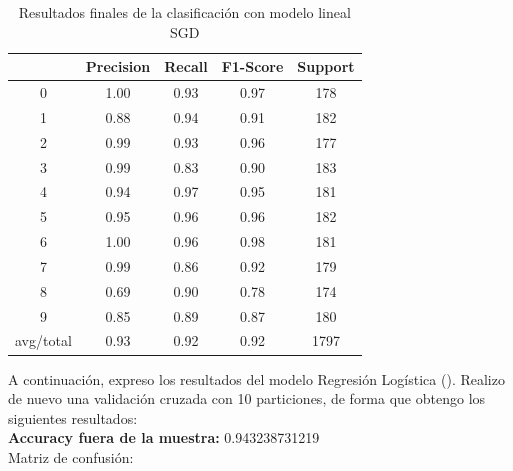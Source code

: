 \begin{table}[H]
	\centering
	\begin{tabular}{|c|c|c|c|c|}
		\hline
		& Precision & Recall & F1-Score & Support \\ \hline
		0         & 1.00      & 0.93   & 0.97     & 178     \\ \hline
		1         & 0.88      & 0.94   & 0.91     & 182     \\ \hline
		2         & 0.99      & 0.93   & 0.96     & 177     \\ \hline
		3         & 0.99      & 0.83   & 0.90     & 183     \\ \hline
		4         & 0.94      & 0.97   & 0.95     & 181     \\ \hline
		5         & 0.95      & 0.96   & 0.96     & 182     \\ \hline
		6         & 1.00      & 0.96   & 0.98     & 181     \\ \hline
		7         & 0.99      & 0.86   & 0.92     & 179     \\ \hline
		8         & 0.69      & 0.90   & 0.78     & 174     \\ \hline
		9         & 0.85      & 0.89   & 0.87     & 180     \\ \hline
		avg/total & 0.93      & 0.92   & 0.92     & 1797    \\ \hline
	\end{tabular}
	\caption{Resultados finales de la clasificación con modelo lineal SGD}
\end{table}



A continuación, expreso los resultados del modelo Regresión Logística (\cite{lr}). Realizo de nuevo una validación cruzada con 10 particiones, de forma que obtengo los siguientes resultados: \\

\textbf{Accuracy fuera de la muestra:} 0.943238731219 \\

Matriz de confusión:

